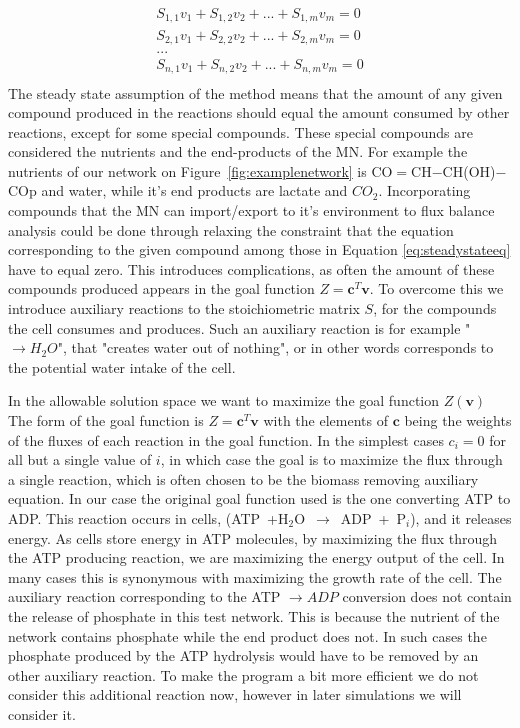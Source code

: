 \documentclass[a4paper,12pt]{article}
\begin{document}
	\begin{equation}\label{eq:steadystateeq}
		\begin{matrix}
			S_{1,1} v_1 + S_{1,2} v_2 + ... + S_{1,m} v_m=0 \\
			S_{2,1} v_1 + S_{2,2} v_2 + ... + S_{2,m} v_m=0 \\
			... \\
			S_{n,1} v_1 + S_{n,2} v_2 + ... + S_{n,m} v_m=0 \\
		\end{matrix}
	\end{equation}
	The steady state assumption of the method means that the amount of any given compound produced in the reactions should equal the amount consumed by other reactions, except for some special compounds. These special compounds are considered the nutrients and the end-products of the MN. For example the nutrients of our network on Figure~\ref {fig:examplenetwork} is CO$=$CH$-$CH(OH)$-$COp and water, while it's end products are lactate and $CO_2$. Incorporating compounds that the MN can import/export to it's environment to flux balance analysis could be done through relaxing the constraint that the equation corresponding to the given compound among those in Equation \ref{eq:steadystateeq} have to equal zero. This introduces complications, as often the amount of these compounds produced appears in the goal function  $Z=\mathbf{c}^T \mathbf{v}$. To overcome this we introduce auxiliary reactions to the stoichiometric matrix $S$, for the compounds the cell consumes and produces. Such an auxiliary reaction is for example " $ \rightarrow H_2O$", that "creates water out of nothing", or in other words corresponds to the potential water intake of the cell.%


	In the allowable solution space we want to maximize the goal function $Z \left( \mathbf{v} \right)$ The form of the goal function is $Z=\mathbf{c}^T \mathbf{v}$ with the elements of $\mathbf{c}$ being the weights of the fluxes of each reaction in the goal function. In the simplest cases $c_i=0$ for all but a single value of $i$, in which case the goal is to maximize the flux through a single reaction, which is often chosen to be the biomass removing auxiliary equation. In our case the original goal function used is the one converting ATP to ADP. This reaction occurs in cells, (ATP~+H$_2$O~$\rightarrow$~ADP~+~P$_i$), and it releases energy. As cells store energy in ATP molecules,  by maximizing the flux through the ATP producing reaction, we are maximizing the energy output of the cell. In many cases this is synonymous with maximizing the growth rate of the cell. The auxiliary reaction corresponding to the ATP $\rightarrow ADP$ conversion does not contain the release of phosphate in this test network. This is because the nutrient of the network contains phosphate while the end product does not. In such cases the phosphate produced by the ATP hydrolysis would have to be removed by an other auxiliary reaction. To make the program a bit more efficient we do not consider this additional reaction now, however in later simulations we will consider it. 
	
\end{document}
